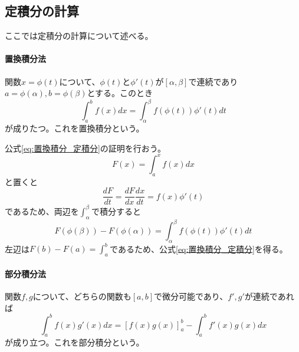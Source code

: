 \documentclass[a4j,dvipdfmx]{jsarticle}
\begin{document}
            \subsection{定積分の計算}
                ここでは定積分の計算について述べる。
                \paragraph{置換積分法}
                    関数$x=\phi(t)$について、$\phi(t)$と$\phi'(t)$が$[\alpha,\beta]$で連続であり$a=\phi(\alpha),b=\phi(\beta)$とする。このとき
                    \begin{equation}
                        \int_{a}^{b}f(x)dx = \int_{\alpha}^{\beta}f(\phi(t))\phi'(t)dt\label{eq:置換積分_定積分}
                    \end{equation}
                    が成りたつ。これを置換積分という。

                    公式\eqref{eq:置換積分_定積分}の証明を行おう。
                    \begin{equation*}
                        F(x)=\int_{a}^{x}f(x)dx
                    \end{equation*}
                    と置くと
                    \begin{equation*}
                        \frac{dF}{dt}=\frac{dF}{dx}\frac{dx}{dt}=f(x)\phi'(t)
                    \end{equation*}
                    であるため、両辺を$\int_{\alpha}^{\beta}$で積分すると
                    \begin{equation*}
                        F(\phi(\beta))-F(\phi(\alpha))=\int_{\alpha}^{\beta}f(\phi(t))\phi'(t)dt
                    \end{equation*}
                    左辺は$F(b)-F(a)=\int_a^b $であるため、公式\eqref{eq:置換積分_定積分}を得る。

                \paragraph{部分積分法}
                    関数$f,g$について、どちらの関数も$[a,b]$で微分可能であり、$f',g'$が連続であれば
                    \begin{equation}
                        \int_a^b f(x)g'(x)dx = \left[f(x)g(x)\right]_a^b - \int_a^b f'(x)g(x)dx \label{eq:部分積分_定積分}
                    \end{equation}
                    が成り立つ。これを部分積分という。
\end{document}

